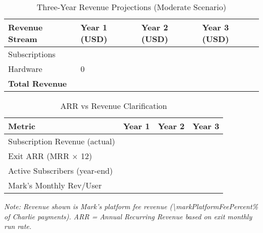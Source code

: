 
\begin{table}[H]
\centering
\caption{Three-Year Revenue Projections (Moderate Scenario)}
\begin{tabularx}{\linewidth}{l Y Y Y}
\toprule
Revenue Stream & Year 1 (USD) & Year 2 (USD) & Year 3 (USD) \\\midrule
Subscriptions & \numint{\subRevenueYearOne} & \numint{\subRevenueYearTwo} & \numint{\subRevenueYearThree} \\
Hardware & \num{0} & \numint{\hwWeightedAvgGP * \hwCustomersYearTwo} & \numint{\hwWeightedAvgGP * \hwCustomersYearThree} \\\midrule
\textbf{Total Revenue} & \textbf{\numint{\subRevenueYearOne}} & \textbf{\numint{\subRevenueYearTwo + \hwWeightedAvgGP * \hwCustomersYearTwo}} & \textbf{\numint{\subRevenueYearThree + \hwWeightedAvgGP * \hwCustomersYearThree}} \\
\bottomrule
\end{tabularx}
\end{table}

\begin{table}[H]
\centering
\caption{ARR vs Revenue Clarification}
\begin{tabularx}{\linewidth}{l Y Y Y}
\toprule
Metric & Year 1 & Year 2 & Year 3 \\\midrule
Subscription Revenue (actual) & \numint{\subRevenueYearOne} & \numint{\subRevenueYearTwo} & \numint{\subRevenueYearThree} \\
Exit ARR (MRR $\times$ 12) & \numint{\subARRYearOne} & \numint{\subARRYearTwo} & \numint{\subARRYearThree} \\
Active Subscribers (year-end) & \numint{\totalSubsYearOne} & \numint{\totalSubsYearTwo} & \numint{\totalSubsYearThree} \\
Mark's Monthly Rev/User & \numfpeval{\markWeightedAvgMonthly} & \numfpeval{\markWeightedAvgMonthly} & \numfpeval{\markWeightedAvgMonthly} \\
\bottomrule
\end{tabularx}
\end{table}
\textit{Note: Revenue shown is Mark's platform fee revenue (\num{\markPlatformFeePercent}\% of Charlie payments). ARR = Annual Recurring Revenue based on exit monthly run rate.}